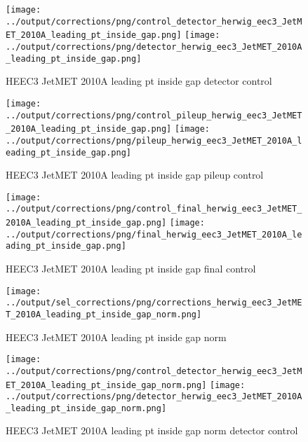 \documentclass[11pt]{book}
\begin{document}
\begin{figure}[ht]
\centering
\texttt{[image: ../output/corrections/png/control\_detector\_herwig\_eec3\_JetMET\_2010A\_leading\_pt\_inside\_gap.png]}
\texttt{[image: ../output/corrections/png/detector\_herwig\_eec3\_JetMET\_2010A\_leading\_pt\_inside\_gap.png]}
\caption{HEEC3 JetMET 2010A leading pt inside gap detector control}
\label{fig:HEEC3_JetMET_2010A_leading_pt_inside_gap_detector_control}
\end{figure}

\begin{figure}[ht]
\centering
\texttt{[image: ../output/corrections/png/control\_pileup\_herwig\_eec3\_JetMET\_2010A\_leading\_pt\_inside\_gap.png]}
\texttt{[image: ../output/corrections/png/pileup\_herwig\_eec3\_JetMET\_2010A\_leading\_pt\_inside\_gap.png]}
\caption{HEEC3 JetMET 2010A leading pt inside gap pileup control}
\label{fig:HEEC3_JetMET_2010A_leading_pt_inside_gap_pileup_control}
\end{figure}


\begin{figure}[ht]
\centering
\texttt{[image: ../output/corrections/png/control\_final\_herwig\_eec3\_JetMET\_2010A\_leading\_pt\_inside\_gap.png]}
\texttt{[image: ../output/corrections/png/final\_herwig\_eec3\_JetMET\_2010A\_leading\_pt\_inside\_gap.png]}
\caption{HEEC3 JetMET 2010A leading pt inside gap final control}
\label{fig:HEEC3_JetMET_2010A_leading_pt_inside_gap_final_control}
\end{figure}



\begin{figure}[ht]
\centering
\texttt{[image: ../output/sel\_corrections/png/corrections\_herwig\_eec3\_JetMET\_2010A\_leading\_pt\_inside\_gap\_norm.png]}
\caption{HEEC3 JetMET 2010A leading pt inside gap norm}
\label{fig:HEEC3_JetMET_2010A_leading_pt_inside_gap_norm}
\end{figure}

\begin{figure}[ht]
\centering
\texttt{[image: ../output/corrections/png/control\_detector\_herwig\_eec3\_JetMET\_2010A\_leading\_pt\_inside\_gap\_norm.png]}
\texttt{[image: ../output/corrections/png/detector\_herwig\_eec3\_JetMET\_2010A\_leading\_pt\_inside\_gap\_norm.png]}
\caption{HEEC3 JetMET 2010A leading pt inside gap norm detector control}
\label{fig:HEEC3_JetMET_2010A_leading_pt_inside_gap_norm_detector_control}
\end{figure}
\end{document}
